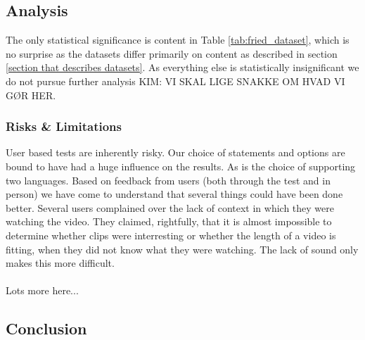 \subsection{Analysis}
%
The only statistical significance is content in Table \ref{tab:fried_dataset}, which is no surprise as the datasets differ primarily on content as described in section \ref{section that describes datasets}. As everything else is statistically insignificant we do not pursue further analysis KIM: VI SKAL LIGE SNAKKE OM HVAD VI GØR HER.
%
\subsubsection{Risks \& Limitations}
%
User based tests are inherently risky. Our choice of statements and options are bound to have had a huge influence on the results. As is the choice of supporting two languages. Based on feedback from users (both through the test and in person) we have come to understand that several things could have been done better. Several users complained over the lack of context in which they were watching the video. They claimed, rightfully, that it is almost impossible to determine whether clips were interresting or whether the length of a video is fitting, when they did not know what they were watching. The lack of sound only makes this more difficult.\\\\
%
Lots more here...
%
\subsection{Conclusion}
%
%